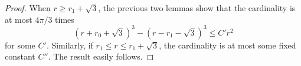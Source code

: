 \begin{proof}  When $r \ge r_1+\sqrt3$, the previous two lemmas show
that the cardinality is at most $4\pi/3$ times
\begin{displaymath}
(r +r_0 + \sqrt3)^3 - (r - r_1 - \sqrt3)^3 \le C' r^2
\end{displaymath}
for some $C'$.  Similarly, if $r_1\le r\le r_1+\sqrt3$, the
cardinality is at most some fixed constant $C''$.  The result
easily follows.
\end{proof}

